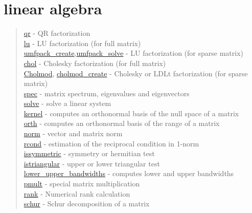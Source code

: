 \chapter*{linear algebra}

\begin{quote}
\noindent
\hyperlink{qr}{qr} - QR factorization \\
\hyperlink{lu}{lu} - LU factorization (for full matrix) \\
\hyperlink{umfpack_create}{umfpack\_create},\hyperlink{umfpack_solve}{umfpack\_solve}
- LU factorization (for sparse matrix) \\
\hyperlink{chol}{chol} - Cholesky factorization (for full matrix) \\
\hyperlink{Cholmod}{Cholmod}, \hyperlink{cholmod_create}{cholmod\_create} - Cholesky or LDLt factorization (for sparse matrix) \\
\hyperlink{spec}{spec} - matrix spectrum, eigenvalues and eigenvectors\\
\hyperlink{solve}{solve} - solve a linear system\\
\hyperlink{kernel}{kernel} - computes an orthonormal basis of the null space of a matrix\\
\hyperlink{orth}{orth} - computes an orthonormal basis of the range of a matrix\\
\hyperlink{norm}{norm} - vector and matrix norm\\
\hyperlink{rcond}{rcond} - estimation of the reciprocal condition in 1-norm\\
\hyperlink{issymmetric}{issymmetric} - symmetry or hermitian test\\
\hyperlink{istriangular}{istriangular} - upper or lower triangular test\\
\hyperlink{lower_upper_bandwidths}{lower\_upper\_bandwidths} - computes lower and upper bandwidths\\
\hyperlink{pmult}{pmult} - special matrix multiplication\\
\hyperlink{rank}{rank} - Numerical rank calculation \\
\hyperlink{schur}{schur} - Schur decomposition of a matrix \\
\end{quote}

 
 
 
 
 


 
 
 
 



